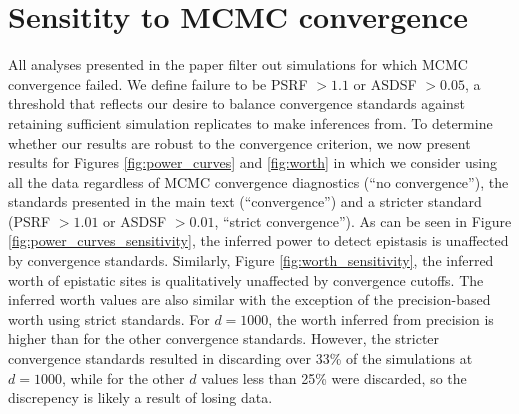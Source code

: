 \documentclass[11pt]{article}
\begin{document}
\section*{Sensitity to MCMC convergence}
All analyses presented in the paper filter out simulations for which MCMC convergence failed.
We define failure to be PSRF $> 1.1$ or ASDSF $> 0.05$, a threshold that reflects our desire to balance convergence standards against retaining sufficient simulation replicates to make inferences from.
To determine whether our results are robust to the convergence criterion, we now present results for Figures \ref{fig:power_curves} and \ref{fig:worth} in which we consider using all the data regardless of MCMC convergence diagnostics (``no convergence''), the standards presented in the main text (``convergence'') and a stricter standard (PSRF $> 1.01$ or ASDSF $> 0.01$, ``strict convergence'').
As can be seen in Figure \ref{fig:power_curves_sensitivity}, the inferred power to detect epistasis is unaffected by convergence standards.
Similarly, Figure \ref{fig:worth_sensitivity}, the inferred worth of epistatic sites is qualitatively unaffected by convergence cutoffs.
The inferred worth values are also similar with the exception of the precision-based worth using strict standards.
For $d = 1000$, the worth inferred from precision is higher than for the other convergence standards.
However, the stricter convergence standards resulted in discarding over 33\% of the simulations at $d = 1000$, while for the other $d$ values less than 25\% were discarded, so the discrepency is likely a result of losing data.
\end{document}
